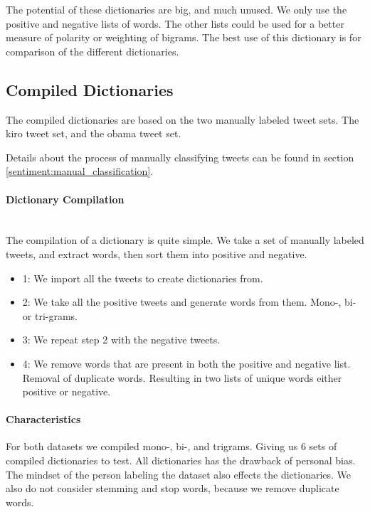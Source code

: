 The potential of these dictionaries are big, and much unused. We only use the
positive and negative lists of words. The other lists could be used for a
better measure of polarity or weighting of bigrams. The best use of this
dictionary is for comparison of the different dictionaries.  
%

\subsection{Compiled Dictionaries}\label{data:compiled_dictionaries}
The compiled dictionaries are based on the two manually labeled tweet sets. The
kiro tweet set, and the obama tweet set.

Details about the process of manually classifying tweets can be found in section
\ref{sentiment:manual_classification}.

\paragraph{Dictionary Compilation}
\hspace{0pt}\\
The compilation of a dictionary is quite simple. We take a set of manually
labeled tweets, and extract words, then sort them into positive and negative.
\begin{itemize}
    \item 1: We import all the tweets to create dictionaries from. 
    \item 2: We take all the positive tweets and generate words from them.
Mono-, bi- or tri-grams. 
    \item 3: We repeat step 2 with the negative tweets. 
    \item 4: We remove words that are present in both the positive and negative
list. Removal of duplicate words. Resulting in two lists of unique words either
positive or negative.  
\end{itemize}

\paragraph{Characteristics}
For both datasets we compiled mono-, bi-, and trigrams. Giving us 6 sets of
compiled dictionaries to test. All dictionaries has the drawback of personal
bias. The mindset of the person labeling the dataset also effects the
dictionaries. We also do not consider stemming and stop words, because we
remove duplicate words.  
%

